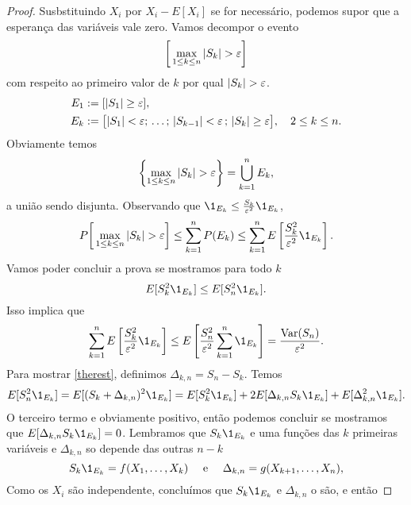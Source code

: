 \begin{topics}
\begin{theorem}
\end{theorem}


\begin{proof}
  Susbstituindo $X_i$ por $X_i-E[X_i]$ se for necessário, podemos supor que a esperança das variáveis vale zero.
  Vamos decompor o evento
  \begin{equation}
    \bigg[ \max_{1\le k\le n} |S_k|>\gep \bigg]
  \end{equation}
  com respeito ao primeiro valor de $k$ por qual $|S_k|>\gep$.
 \begin{equation}
   \begin{split}
     E_1 & := [|S_1|\ge \varepsilon ],\\
     E_k & := \big[|S_1|<\varepsilon;\, \dots ;\,  |S_{k-1}|<\varepsilon\, ;  \, |S_k|\ge \varepsilon \big],
           \quad 2\le k\le n.
   \end{split}
 \end{equation}
 Obviamente temos $$\left\{\max_{1\le k\le n} |S_k|>\gep\right\}=\bigcup_{k=1}^n E_k,$$
 a união sendo disjunta.
 Observando que $\1_{E_k} \leq \tfrac{S_k}{\gep^2} \1_{E_k}$,
 \begin{equation}
   P \bigg[ \max_{1\le k\le n} |S_k|>\gep \bigg] \le  \sum_{k=1}^n P(E_k)\le  \sum_{k=1}^n E\left[  \frac{S^2_k}{\gep^2}\1_{E_k}\right].
 \end{equation}
 Vamos poder concluir a prova se mostramos para todo $k$
 \begin{equation}\label{therest}
   E[S^2_k\1_{E_k}]\le E[S^2_n\1_{E_k}].
 \end{equation}
 Isso implica que
 \begin{equation}
   \sum_{k=1}^n E\left[  \frac{S^2_k}{\gep^2}\1_{E_k}\right]\le E\left [  \frac{S^2_n}{\gep^2}  \sum_{k=1}^n \1_{E_k}\right]= \frac{\Var(S_n)}{\gep^2}.
 \end{equation}
 Para mostrar \eqref{therest}, definimos $\Delta_{k,n}= S_n-S_k$.
 Temos
 \begin{equation}
   E[S^2_n\1_{E_k}]= E[(S_k+\Delta_{k,n})^2\1_{E_k}]= E[S_k^2\1_{E_k}]+2 E[ \Delta_{k,n} S_k \1_{E_k}]+  E[ \Delta^2_{k,n}\1_{E_k}].
 \end{equation}
 O terceiro termo e obviamente positivo, então podemos concluir se mostramos  que $E[ \Delta_{k,n} S_k \1_{E_k}]=0$.
 Lembramos que $S_k\1_{E_k}$ e uma funções das $k$ primeiras variáveis e $\Delta_{k,n}$ so depende das outras $n-k$
 \begin{equation}
   S_k \1_{E_k}=f(X_1,\dots,X_k) \quad \text{ e } \quad \Delta_{k,n}=g(X_{k+1},\dots,X_{n}),
 \end{equation}
 Como os $X_i$ são independente, concluímos que  $S_k \1_{E_k}$ e $\Delta_{k,n}$ o são, e então


\end{proof}
\end{topics}
